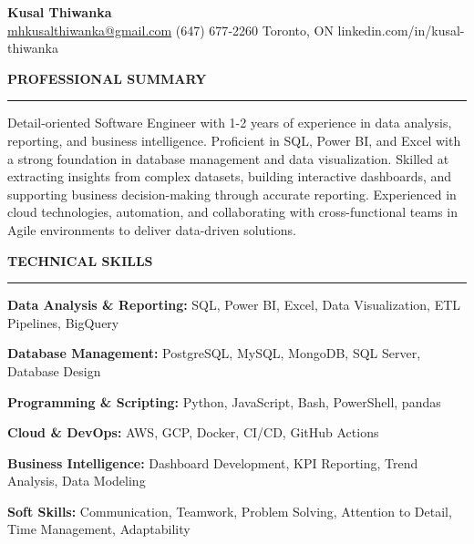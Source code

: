 \documentclass[10pt,letterpaper]{article}
\begin{document}
\begin{center}
{\LARGE\textbf{Kusal Thiwanka}}\\[3pt]
\href{mailto:mhkusalthiwanka@gmail.com}{mhkusalthiwanka@gmail.com}\hspace{2em}%
(647) 677{-}2260\hspace{2em}%
Toronto, ON\hspace{2em}
linkedin.com/in/kusal-thiwanka
\end{center}

\vspace{6pt}

\textbf{PROFESSIONAL SUMMARY}\\[-8pt]
\noindent\rule{\textwidth}{1pt}

\vspace{-2pt}

Detail-oriented Software Engineer with 1-2 years of experience in data analysis, reporting, and business intelligence. Proficient in SQL, Power BI, and Excel with a strong foundation in database management and data visualization. Skilled at extracting insights from complex datasets, building interactive dashboards, and supporting business decision-making through accurate reporting. Experienced in cloud technologies, automation, and collaborating with cross-functional teams in Agile environments to deliver data-driven solutions.

\vspace{8pt}

\textbf{TECHNICAL SKILLS}\\[-8pt]
\noindent\rule{\textwidth}{1pt}

\vspace{-2pt}

\textbf{Data Analysis \& Reporting:} SQL, Power BI, Excel, Data Visualization, ETL Pipelines, BigQuery

\textbf{Database Management:} PostgreSQL, MySQL, MongoDB, SQL Server, Database Design

\textbf{Programming \& Scripting:} Python, JavaScript, Bash, PowerShell, pandas

\textbf{Cloud \& DevOps:} AWS, GCP, Docker, CI/CD, GitHub Actions

\textbf{Business Intelligence:} Dashboard Development, KPI Reporting, Trend Analysis, Data Modeling

\textbf{Soft Skills:} Communication, Teamwork, Problem Solving, Attention to Detail, Time Management, Adaptability

\vspace{8pt}
\end{document}
